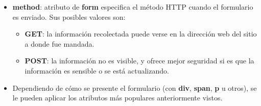 \begin{itemize}
    \item \textbf{method}: atributo de \textbf{form} especifica el método HTTP cuando el formulario es enviado. Sus posibles valores son:
    \begin{itemize}
        \item \textbf{GET}: la información recolectada puede verse en la dirección web del sitio a donde fue mandada.
        \item \textbf{POST}: la información no es visible, y ofrece mejor seguridad si es que la información es sensible o se está actualizando.
    \end{itemize}
    \item Dependiendo de cómo se presente el formulario (con \textbf{div}, \textbf{span}, \textbf{p} u otros), se le pueden aplicar los atributos más populares anteriormente vistos.
\end{itemize}

